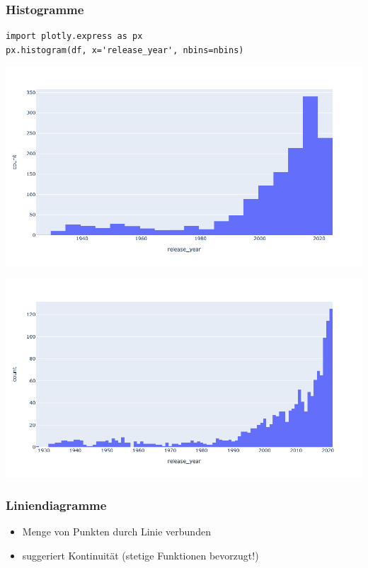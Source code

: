 \begin{frame}[fragile]
\frametitle{Histogramme}

\begin{verbatim}
import plotly.express as px
px.histogram(df, x='release_year', nbins=nbins)
\end{verbatim}

\begin{minipage}{0.5\textwidth}%
\begin{center}%
\includegraphics[width=\linewidth]{fig5/histogram3.png}%
\end{center}%
\end{minipage}%
\begin{minipage}{0.5\textwidth}%
\begin{center}%
\includegraphics[width=\linewidth]{fig5/histogram4.png}%
\end{center}%
\end{minipage}%
\end{frame}


\begin{frame}
\frametitle{Liniendiagramme}

\begin{itemize}
\item Menge von Punkten durch Linie verbunden
\item suggeriert Kontinuität (stetige Funktionen bevorzugt!)
\end{itemize}
\end{frame}


